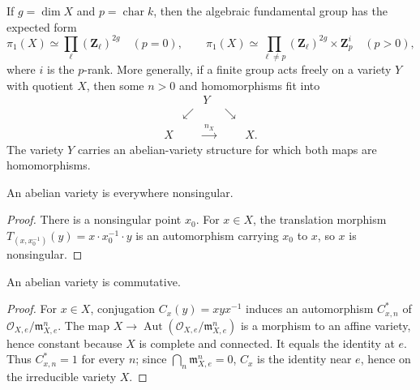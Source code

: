 \begin{proposition}
\label{mumford-source-II4-roadmap}
If $g=\dim X$ and $p=\operatorname{char}k$, then the algebraic fundamental group
has the expected form
\[
 \pi_1(X)\simeq\prod_\ell(\mathbf Z_\ell)^{2g}\quad(p=0),\qquad
 \pi_1(X)\simeq\prod_{\ell\ne p}(\mathbf Z_\ell)^{2g}\times\mathbf Z_p^i
 \quad(p>0),
\]
where $i$ is the $p$-rank.  More generally, if a finite group acts freely on a
variety $Y$ with quotient $X$, then some $n>0$ and homomorphisms fit into
\[
\begin{array}{ccccc}&&Y&&\\[-2pt]&\swarrow&&\searrow&\\[-2pt]
X&&\xrightarrow{\,n_X\,}&&X.
\end{array}
\]
The variety $Y$ carries an abelian-variety structure for which both maps are
homomorphisms.
\notready
\end{proposition}

\begin{lemma}
\label{mumford-source-nonsingular}
An abelian variety is everywhere nonsingular.
\end{lemma}
\begin{proof}
There is a nonsingular point $x_0$. For $x\in X$, the translation morphism
$T_{(x,x_0^{-1})}(y)=x\cdot x_0^{-1}\cdot y$ is an automorphism carrying
$x_0$ to $x$, so $x$ is nonsingular.
\end{proof}

\begin{theorem}
\label{mumford-source-commutativity-I}
An abelian variety is commutative.
\end{theorem}
\begin{proof}
For $x\in X$, conjugation $C_x(y)=xyx^{-1}$ induces an automorphism
$C^*_{x,n}$ of $\mathcal O_{X,e}/\mathfrak m_{X,e}^n$. The map
$X\to\operatorname{Aut}(\mathcal O_{X,e}/\mathfrak m_{X,e}^n)$ is a morphism
to an affine variety, hence constant because $X$ is complete and connected.
It equals the identity at $e$. Thus $C^*_{x,n}=1$ for every $n$; since
$\bigcap_n\mathfrak m_{X,e}^n=0$, $C_x$ is the identity near $e$, hence on
the irreducible variety $X$.
\end{proof}

